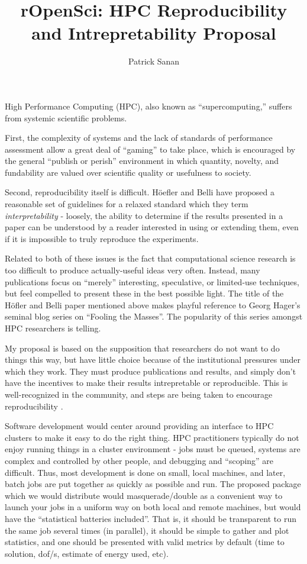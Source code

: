 \documentclass{article}
\title{rOpenSci: HPC Reproducibility and Intrepretability Proposal}
\author{Patrick Sanan}
\begin{document}
\maketitle


High Performance Computing (HPC), also known as ``supercomputing,'' suffers from systemic scientific problems.

First, the complexity of systems and the lack of standards of performance assessment allow a great deal of ``gaming'' to take place,
which is encouraged by the general ``publish or perish'' environment in which quantity, novelty, and fundability are valued over 
scientific quality or usefulness to society.

Second, reproducibility itself is difficult. H\"{o}efler and Belli have proposed a reasonable set of guidelines for a relaxed standard which they term \emph{interpretability}\cite{HoeflerBelli2015} - loosely, the ability to determine if the results presented in a paper can be understood by a reader interested in using or extending them, even if it is impossible to truly reproduce the experiments.

Related to both of these issues is the fact that computational science research is too difficult to produce actually-useful ideas very often. Instead, many publications focus on ``merely'' interesting, speculative, or limited-use techniques, but feel compelled to present these in the best possible light. The title of the H\"{o}fler and Belli paper mentioned above makes playful reference to Georg Hager's seminal blog series on ``Fooling the Masses''\cite{HagerBlog}. The popularity of this series amongst HPC researchers is telling.

My proposal is based on the supposition that researchers do not want to do things this way, but have little choice because of the institutional pressures under which they work. 
They must produce publications and results, and simply don't have the incentives to make their results intrepretable or reproducible. This is well-recognized in the community, and steps are being taken to encourage reproducibility \cite{SCRepro}.

Software development would center around providing an interface to HPC clusters to make it easy to do the right thing. 
HPC practitioners typically do not enjoy running things in a cluster environment - jobs must be queued, systems are complex and controlled by other people, and debugging and ``scoping'' are difficult. Thus, most development is done on small, local machines, and later, batch jobs are put together as quickly as possible and run.
The proposed package which we would distribute would masquerade/double as a convenient way to launch your jobs in a uniform way on both local and remote machines, but would have the ``statistical batteries included''. That is, it should be transparent to run the same job several times (in parallel), it should be simple to gather and plot statistics, and one should be presented with valid metrics by default (time to solution, dof/s, estimate of energy used, etc).
\end{document}
